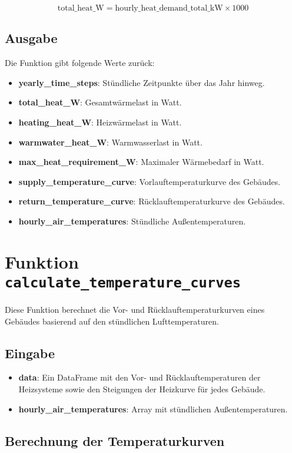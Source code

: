 \[
\text{total\_heat\_W} = \text{hourly\_heat\_demand\_total\_kW} \times 1000
\]

\subsection{Ausgabe}
Die Funktion gibt folgende Werte zurück:
\begin{itemize}
    \item \textbf{yearly\_time\_steps}: Stündliche Zeitpunkte über das Jahr hinweg.
    \item \textbf{total\_heat\_W}: Gesamtwärmelast in Watt.
    \item \textbf{heating\_heat\_W}: Heizwärmelast in Watt.
    \item \textbf{warmwater\_heat\_W}: Warmwasserlast in Watt.
    \item \textbf{max\_heat\_requirement\_W}: Maximaler Wärmebedarf in Watt.
    \item \textbf{supply\_temperature\_curve}: Vorlauftemperaturkurve des Gebäudes.
    \item \textbf{return\_temperature\_curve}: Rücklauftemperaturkurve des Gebäudes.
    \item \textbf{hourly\_air\_temperatures}: Stündliche Außentemperaturen.
\end{itemize}

\section{Funktion \texttt{calculate\_temperature\_curves}}

Diese Funktion berechnet die Vor- und Rücklauftemperaturkurven eines Gebäudes basierend auf den stündlichen Lufttemperaturen.

\subsection{Eingabe}
\begin{itemize}
    \item \textbf{data}: Ein DataFrame mit den Vor- und Rücklauftemperaturen der Heizsysteme sowie den Steigungen der Heizkurve für jedes Gebäude.
    \item \textbf{hourly\_air\_temperatures}: Array mit stündlichen Außentemperaturen.
\end{itemize}

\subsection{Berechnung der Temperaturkurven}

